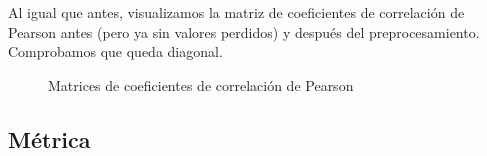 \documentclass[a4]{article}
\begin{document}
Al igual que antes, visualizamos la matriz de coeficientes de
correlación de Pearson antes (pero ya sin valores perdidos) y después
del preprocesamiento. Comprobamos que queda diagonal.

\vspace{-4mm}
\begin{figure}[H]
  \centering
  \caption{Matrices de coeficientes de correlación de Pearson}
  \label{fig:com_pearson}
\end{figure}
\vspace{-4mm}

\subsection{Métrica}
\end{document}
